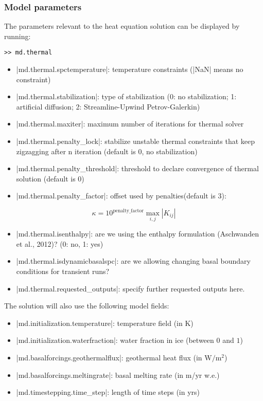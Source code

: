 \subsubsection{Model parameters}
The parameters relevant to the heat equation solution can be displayed by running:
\begin{lstlisting}
>> md.thermal
\end{lstlisting}

\begin{itemize}
	\item \lstinlinebg|md.thermal.spctemperature|: temperature constraints (\lstinlinebg|NaN| means no constraint)
	\item \lstinlinebg|md.thermal.stabilization|: type of stabilization (0: no stabilization; 1: artificial diffusion; 2: Streamline-Upwind Petrov-Galerkin)
	\item \lstinlinebg|md.thermal.maxiter|: maximum number of iterations for thermal solver
	\item \lstinlinebg|md.thermal.penalty_lock|: stabilize unstable thermal constraints that keep zigzagging after n iteration (default is 0, no stabilization)
	\item \lstinlinebg|md.thermal.penalty_threshold|: threshold to declare convergence of thermal solution (default is 0)
	\item \lstinlinebg|md.thermal.penalty_factor|: offset used by penalties(default is 3):
\end{itemize}
\begin{equation}
	\kappa=10^{\text{penalty\_factor}} \max_{i,j}\left| K_{ij}\right|
\end{equation}
\begin{itemize}
	\item \lstinlinebg|md.thermal.isenthalpy|: are we using the enthalpy formulation (Aschwanden et al., 2012)? (0: no, 1: yes)
	\item \lstinlinebg|md.thermal.isdynamicbasalspc|: are we allowing changing basal boundary conditions for transient runs?
	\item \lstinlinebg|md.thermal.requested_outputs|: specify further requested outputs here.
\end{itemize}

The solution will also use the following model fields:
\begin{itemize}
	\item \lstinlinebg|md.initialization.temperature|: temperature field (in K)
	\item \lstinlinebg|md.initialization.waterfraction|: water fraction in ice (between $0$ and $1$)
	\item \lstinlinebg|md.basalforcings.geothermalflux|: geothermal heat flux (in $\mbox{W}/\mbox{m}^2$)
	\item \lstinlinebg|md.basalforcings.meltingrate|: basal melting rate (in m/yr w.e.)
	\item \lstinlinebg|md.timestepping.time_step|: length of time steps (in yrs)
\end{itemize}

